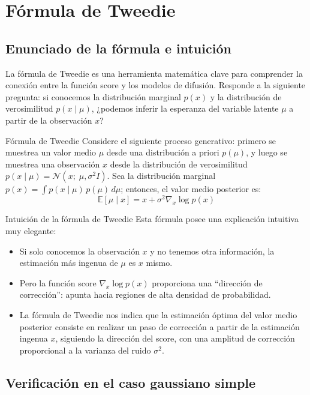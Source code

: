 \section{Fórmula de Tweedie}

\subsection{Enunciado de la fórmula e intuición}

La fórmula de Tweedie es una herramienta matemática clave para comprender la conexión entre la función score y los modelos de difusión. Responde a la siguiente pregunta: si conocemos la distribución marginal $p(x)$ y la distribución de verosimilitud $p(x \mid \mu)$, ¿podemos inferir la esperanza del variable latente $\mu$ a partir de la observación $x$?

\begin{importantbox}{Fórmula de Tweedie}
Considere el siguiente proceso generativo: primero se muestrea un valor medio $\mu$ desde una distribución a priori $p(\mu)$, y luego se muestrea una observación $x$ desde la distribución de verosimilitud $p(x \mid \mu) = \mathcal{N}(x;\; \mu, \sigma^2 I)$. Sea la distribución marginal $p(x) = \int p(x \mid \mu)\, p(\mu)\, d\mu$; entonces, el valor medio posterior es:
$$\mathbb{E}[\mu \mid x] = x + \sigma^2 \nabla_x \log p(x)$$
\end{importantbox}

\begin{knowledgebox}{Intuición de la fórmula de Tweedie}
Esta fórmula posee una explicación intuitiva muy elegante:
\begin{itemize}
    \item Si solo conocemos la observación $x$ y no tenemos otra información, la estimación más ingenua de $\mu$ es $x$ mismo.
    \item Pero la función score $\nabla_x \log p(x)$ proporciona una ``dirección de corrección'': apunta hacia regiones de alta densidad de probabilidad.
    \item La fórmula de Tweedie nos indica que la estimación óptima del valor medio posterior consiste en realizar un paso de corrección a partir de la estimación ingenua $x$, siguiendo la dirección del score, con una amplitud de corrección proporcional a la varianza del ruido $\sigma^2$.
\end{itemize}
\end{knowledgebox}

\subsection{Verificación en el caso gaussiano simple}


